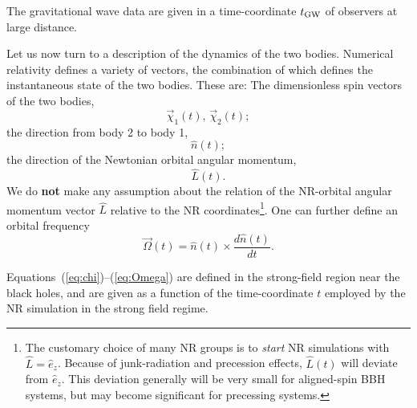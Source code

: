 \documentclass[11pt,tightenlines,article,amssymb,amsmath,amsfonts,superscriptaddress]{revtex4}
\newcommand{\EzNR}{\hat e_z}
\newcommand{\nNR}{\hat{n}}
\newcommand{\lNR}{\hat L}
\newcommand{\tGW}{t_{\rm GW}}
\begin{document}
The gravitational wave data are given in a time-coordinate $\tGW$ of
observers at large distance.

Let us now turn to a description of the dynamics of the two bodies.
Numerical relativity defines a variety of vectors, the combination of
which defines the instantaneous state of the two bodies.  These are:
The dimensionless spin vectors of the two bodies,
\begin{equation}\label{eq:chi}
  \vec\chi_1(t),\, \vec\chi_2(t);
\end{equation}
the direction from body 2 to body 1,
\begin{equation}
  \nNR(t);
\end{equation}
the direction of the Newtonian orbital angular momentum,
\begin{equation}
  \hat L(t).
\end{equation}
We do {\bf not} make any assumption about the relation of the
NR-orbital angular momentum vector $\lNR$ relative to the NR
coordinates\footnote{The customary choice of many NR groups is to
  \emph{start} NR simulations with $\lNR=\EzNR$.  Because of
  junk-radiation and precession effects, $\lNR(t)$ will deviate from
  $\EzNR$.  This deviation generally will be very small for
  aligned-spin BBH systems, but may become significant for precessing
  systems.}.
One can further define an orbital frequency
\begin{equation}\label{eq:Omega}
  \vec\Omega(t) = \nNR(t) \times \frac{d\nNR(t)}{dt}.
\end{equation}

Equations~(\ref{eq:chi})--(\ref{eq:Omega}) are defined in the
strong-field region near the black holes, and are given as a function
of the time-coordinate $t$ employed by the NR simulation in the strong
field regime.
\end{document}
